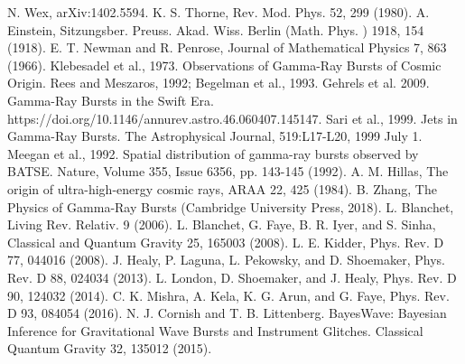 \documentclass[binding=0.6cm, LaM]{sapthesis}
\begin{document}
\begin{thebibliography}{500}
 	 N. Wex, arXiv:1402.5594.
	 K. S. Thorne, Rev. Mod. Phys. 52, 299 (1980).
         A. Einstein, Sitzungsber. Preuss. Akad. Wiss. Berlin (Math. Phys. ) 1918, 154 (1918).
         E. T. Newman and R. Penrose, Journal of Mathematical Physics 7, 863 (1966).
	 Klebesadel et al., 1973. Observations of Gamma-Ray Bursts of Cosmic Origin.
	 Rees and Meszaros, 1992; Begelman et al., 1993.
	 Gehrels et al. 2009. Gamma-Ray Bursts in the Swift Era. https://doi.org/10.1146/annurev.astro.46.060407.145147.
	 Sari et al., 1999. Jets in Gamma-Ray Bursts. The Astrophysical Journal, 519:L17-L20, 1999 July 1.
	 Meegan et al., 1992. Spatial distribution of gamma-ray bursts observed by BATSE. Nature, Volume 355, Issue 6356, pp. 143-145 (1992).
	 A. M. Hillas, The origin of ultra-high-energy cosmic rays, ARAA 22, 425 (1984).
	 B. Zhang, The Physics of Gamma-Ray Bursts (Cambridge University Press, 2018).
	 L. Blanchet, Living Rev. Relativ. 9 (2006). 
	 L. Blanchet, G. Faye, B. R. Iyer, and S. Sinha, Classical and Quantum Gravity 25, 165003 (2008). 
	 L. E. Kidder, Phys. Rev. D 77, 044016 (2008). 
	 J. Healy, P. Laguna, L. Pekowsky, and D. Shoemaker, Phys. Rev. D 88, 024034 (2013). 
	 L. London, D. Shoemaker, and J. Healy, Phys. Rev. D 90, 124032 (2014). 
	 C. K. Mishra, A. Kela, K. G. Arun, and G. Faye, Phys. Rev. D 93, 084054 (2016).
	 N. J. Cornish and T. B. Littenberg. BayesWave: Bayesian Inference for Gravitational Wave Bursts and Instrument Glitches. Classical Quantum Gravity 32, 135012 (2015). 
\end{thebibliography}

\printbibliography
\end{document}
